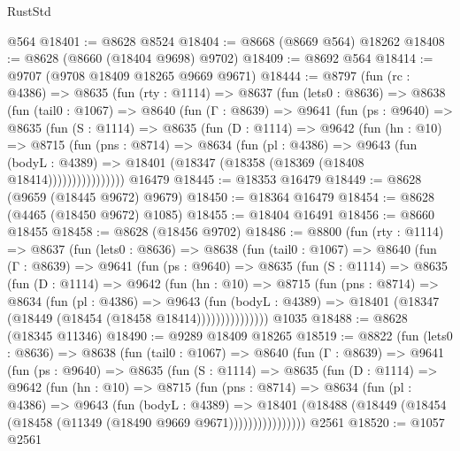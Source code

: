 \begin{lexlean}{RustStd}
\begin{coremodule}
    @564
@18401 := @8628 @8524
@18404 := @8668 (@8669 @564) @18262
@18408 := @8628 (@8660 (@18404 @9698) @9702)
@18409 := @8692 @564
@18414 := @9707 (@9708 @18409 @18265 @9669 @9671)
@18444 := @8797
    (fun (rc : @4386) =>
    @8635
      (fun (rty : @1114) =>
      @8637
        (fun (lets0 : @8636) =>
        @8638
          (fun (tail0 : @1067) =>
          @8640
            (fun (Γ : @8639) =>
            @9641
              (fun (ps : @9640) =>
              @8635
                (fun (S : @1114) =>
                @8635
                  (fun (D : @1114) =>
                  @9642
                    (fun (hn : @10) =>
                    @8715
                      (fun (pns : @8714) =>
                      @8634
                        (fun (pl : @4386) =>
                        @9643
                          (fun (bodyL : @4389) =>
                          @18401 (@18347 (@18358 (@18369 (@18408 @18414))))))))))))))))
    @16479
@18445 := @18353 @16479
@18449 := @8628 (@9659 (@18445 @9672) @9679)
@18450 := @18364 @16479
@18454 := @8628 (@4465 (@18450 @9672) @1085)
@18455 := @18404 @16491
@18456 := @8660 @18455
@18458 := @8628 (@18456 @9702)
@18486 := @8800
    (fun (rty : @1114) =>
    @8637
      (fun (lets0 : @8636) =>
      @8638
        (fun (tail0 : @1067) =>
        @8640
          (fun (Γ : @8639) =>
          @9641
            (fun (ps : @9640) =>
            @8635
              (fun (S : @1114) =>
              @8635
                (fun (D : @1114) =>
                @9642
                  (fun (hn : @10) =>
                  @8715
                    (fun (pns : @8714) =>
                    @8634
                      (fun (pl : @4386) =>
                      @9643
                        (fun (bodyL : @4389) =>
                        @18401 (@18347 (@18449 (@18454 (@18458 @18414)))))))))))))))
    @1035
@18488 := @8628 (@18345 @11346)
@18490 := @9289 @18409 @18265
@18519 := @8822
    (fun (lets0 : @8636) =>
    @8638
      (fun (tail0 : @1067) =>
      @8640
        (fun (Γ : @8639) =>
        @9641
          (fun (ps : @9640) =>
          @8635
            (fun (S : @1114) =>
            @8635
              (fun (D : @1114) =>
              @9642
                (fun (hn : @10) =>
                @8715
                  (fun (pns : @8714) =>
                  @8634
                    (fun (pl : @4386) =>
                    @9643
                      (fun (bodyL : @4389) =>
                      @18401
                        (@18488 (@18449 (@18454 (@18458 (@11349 (@18490 @9669 @9671))))))))))))))))
    @2561
@18520 := @1057 @2561

\end{coremodule}
\end{lexlean}
